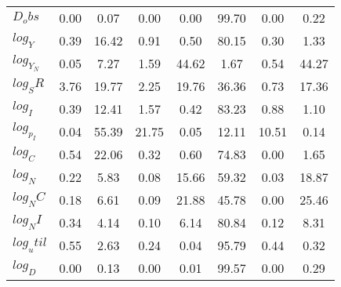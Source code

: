 \begin{center}
\begin{longtable}{lccccccc}
$D_obs     $	 & 	        0.00	 & 	        0.07	 & 	        0.00	 & 	        0.00	 & 	       99.70	 & 	        0.00	 & 	        0.22 \\ 
$log_Y     $	 & 	        0.39	 & 	       16.42	 & 	        0.91	 & 	        0.50	 & 	       80.15	 & 	        0.30	 & 	        1.33 \\ 
$log_Y_N   $	 & 	        0.05	 & 	        7.27	 & 	        1.59	 & 	       44.62	 & 	        1.67	 & 	        0.54	 & 	       44.27 \\ 
$log_SR    $	 & 	        3.76	 & 	       19.77	 & 	        2.25	 & 	       19.76	 & 	       36.36	 & 	        0.73	 & 	       17.36 \\ 
$log_I     $	 & 	        0.39	 & 	       12.41	 & 	        1.57	 & 	        0.42	 & 	       83.23	 & 	        0.88	 & 	        1.10 \\ 
$log_p_I   $	 & 	        0.04	 & 	       55.39	 & 	       21.75	 & 	        0.05	 & 	       12.11	 & 	       10.51	 & 	        0.14 \\ 
$log_C     $	 & 	        0.54	 & 	       22.06	 & 	        0.32	 & 	        0.60	 & 	       74.83	 & 	        0.00	 & 	        1.65 \\ 
$log_N     $	 & 	        0.22	 & 	        5.83	 & 	        0.08	 & 	       15.66	 & 	       59.32	 & 	        0.03	 & 	       18.87 \\ 
$log_NC    $	 & 	        0.18	 & 	        6.61	 & 	        0.09	 & 	       21.88	 & 	       45.78	 & 	        0.00	 & 	       25.46 \\ 
$log_NI    $	 & 	        0.34	 & 	        4.14	 & 	        0.10	 & 	        6.14	 & 	       80.84	 & 	        0.12	 & 	        8.31 \\ 
$log_util  $	 & 	        0.55	 & 	        2.63	 & 	        0.24	 & 	        0.04	 & 	       95.79	 & 	        0.44	 & 	        0.32 \\ 
$log_D     $	 & 	        0.00	 & 	        0.13	 & 	        0.00	 & 	        0.01	 & 	       99.57	 & 	        0.00	 & 	        0.29 \\ 
\end{longtable}
 \end{center}
